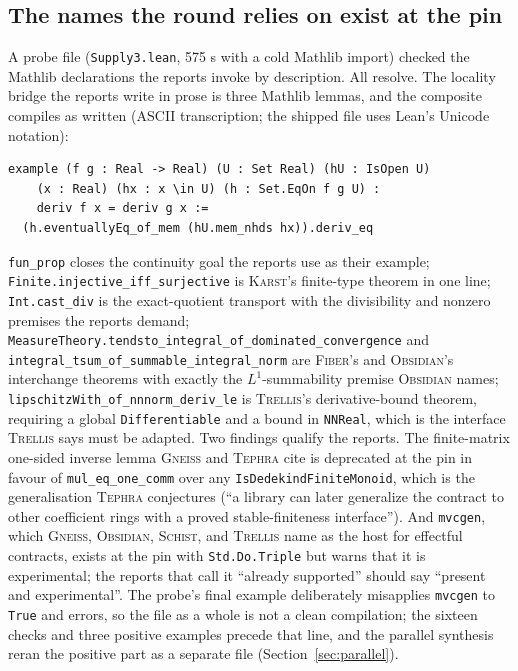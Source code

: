 \documentclass[11pt,a4paper]{article}
\newcommand{\code}[1]{\nolinkurl{#1}}
\newcommand{\codeb}[1]{\nolinkurl{#1}}
\newcommand{\Fb}{\textsc{Fiber}}
\newcommand{\Gn}{\textsc{Gneiss}}
\newcommand{\Ks}{\textsc{Karst}}
\newcommand{\Ob}{\textsc{Obsidian}}
\newcommand{\Sc}{\textsc{Schist}}
\newcommand{\Tp}{\textsc{Tephra}}
\newcommand{\Tr}{\textsc{Trellis}}
\theoremstyle{definition}
\begin{document}
\subsection{The names the round relies on exist at the pin}\label{sec:supply}
A probe file (\code{Supply3.lean}, 575 s with a cold Mathlib import) checked the Mathlib declarations the reports invoke by description. All resolve. The locality bridge the reports write in prose is three Mathlib lemmas, and the composite compiles as written (ASCII transcription; the shipped file uses Lean's Unicode notation):
\begin{lstlisting}
example (f g : Real -> Real) (U : Set Real) (hU : IsOpen U)
    (x : Real) (hx : x \in U) (h : Set.EqOn f g U) :
    deriv f x = deriv g x :=
  (h.eventuallyEq_of_mem (hU.mem_nhds hx)).deriv_eq
\end{lstlisting}
\code{fun_prop} closes the continuity goal the reports use as their example; \code{Finite.injective_iff_surjective} is \Ks's finite-type theorem in one line; \code{Int.cast_div} is the exact-quotient transport with the divisibility and nonzero premises the reports demand; \codeb{MeasureTheory.tendsto_integral_of_dominated_convergence} and \codeb{integral_tsum_of_summable_integral_norm} are \Fb's and \Ob's interchange theorems with exactly the $L^1$-summability premise \Ob{} names; \code{lipschitzWith_of_nnnorm_deriv_le} is \Tr's derivative-bound theorem, requiring a global \code{Differentiable} and a bound in \code{NNReal}, which is the interface \Tr{} says must be adapted. Two findings qualify the reports. The finite-matrix one-sided inverse lemma \Gn{} and \Tp{} cite is deprecated at the pin in favour of \code{mul_eq_one_comm} over any \code{IsDedekindFiniteMonoid}, which is the generalisation \Tp{} conjectures (``a library can later generalize the contract to other coefficient rings with a proved stable-finiteness interface''). And \code{mvcgen}, which \Gn, \Ob, \Sc, and \Tr{} name as the host for effectful contracts, exists at the pin with \code{Std.Do.Triple} but warns that it is experimental; the reports that call it ``already supported'' should say ``present and experimental''. The probe's final example deliberately misapplies \code{mvcgen} to \code{True} and errors, so the file as a whole is not a clean compilation; the sixteen checks and three positive examples precede that line, and the parallel synthesis reran the positive part as a separate file (Section~\ref{sec:parallel}).
\end{document}
